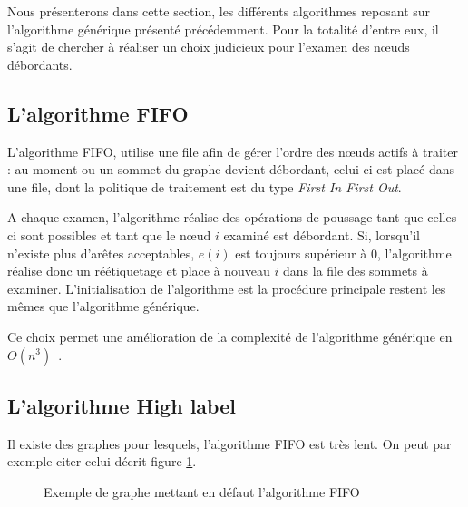 Nous présenterons dans cette section, les différents algorithmes reposant sur l'algorithme générique
présenté précédemment. Pour la totalité d'entre eux, il s'agit de chercher à réaliser un choix
judicieux pour l'examen des n\oe uds débordants.

\subsection{L'algorithme FIFO}

L'algorithme FIFO, utilise une file afin de gérer l'ordre des n\oe uds actifs à traiter : au moment
ou un sommet du graphe devient débordant, celui-ci est placé dans une file, dont la politique de
traitement est du type \emph{First In First Out}. 

A chaque examen, l'algorithme réalise des opérations de poussage tant que celles-ci sont possibles et
tant que le n\oe ud $i$ examiné est débordant. Si, lorsqu'il n'existe plus d'arêtes acceptables,
$e(i)$ est toujours supérieur à $0$, l'algorithme réalise donc un réétiquetage et place à nouveau
$i$ dans la file des sommets à examiner. L'initialisation de l'algorithme est la procédure
principale restent les mêmes que l'algorithme générique.

Ce choix permet une amélioration de la complexité de l'algorithme générique en
$O(n^3)$~\cite{ahuj93}.

\subsection{L'algorithme High label}

Il existe des graphes pour lesquels, l'algorithme FIFO est très lent. On peut par exemple citer
celui décrit figure \ref{bad_fifo}.

\begin{figure}
\begin{center}
\end{center}
\caption{Exemple de graphe mettant en défaut l'algorithme FIFO}
\label{bad_fifo}
\end{figure}

